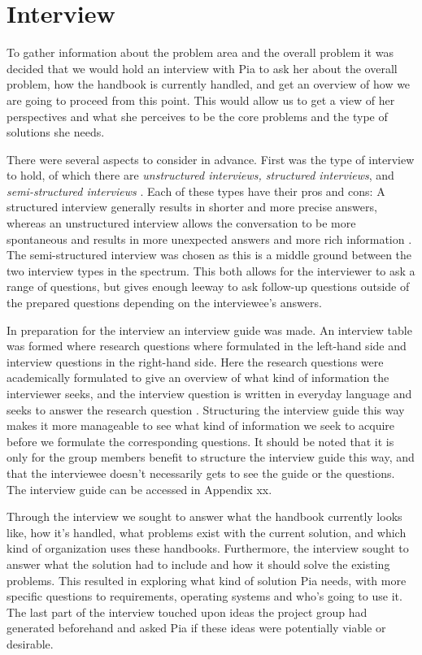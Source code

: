 \section{Interview}

To gather information about the problem area and the overall problem it was decided that
we would hold an interview with Pia to ask her about the overall problem, how the handbook is currently handled, and get an overview of how we are going to proceed from this point. This would allow us to get a view of her perspectives and what she perceives to be the core problems and the type of solutions she needs.

There were several aspects to consider in advance. First was the type of interview to hold, of which there are \textit{unstructured interviews, structured interviews}, and \textit{semi-structured interviews} \citep{interactionhci}. Each of these types have their pros and cons: A structured interview generally results in shorter and more precise answers, whereas an unstructured interview allows the conversation to be more spontaneous and results in more unexpected answers and more rich information \citep{interview}. The semi-structured interview was chosen as this is a middle ground between the two interview types in the spectrum. This both allows for the interviewer to ask a range of questions, but gives enough leeway to ask follow-up questions outside of the prepared questions depending on the interviewee’s answers.

In preparation for the interview an interview guide was made. An interview table was formed where research questions where formulated in the left-hand side and interview questions in the right-hand side. Here the research questions were academically formulated to give an overview of what kind of information the interviewer seeks, and the interview question is written in everyday language and seeks to answer the research question \citep{interview}. Structuring the interview guide this way makes it more manageable to see what kind of information we seek to acquire before we formulate the corresponding questions. It should be noted that it is only for the group members benefit to structure the interview guide this way, and that the interviewee doesn’t necessarily gets to see the guide or the questions. The interview guide can be accessed in Appendix xx.

Through the interview we sought to answer what the handbook currently looks like, how it’s handled, what problems exist with the current solution, and which kind of organization uses these handbooks. Furthermore, the interview sought to answer what the solution had to include and how it should solve the existing problems. This resulted in exploring what kind of solution Pia needs, with more specific questions to requirements, operating systems and who’s going to use it. The last part of the interview touched upon ideas the project group had generated beforehand and asked Pia if these ideas were potentially viable or desirable.


